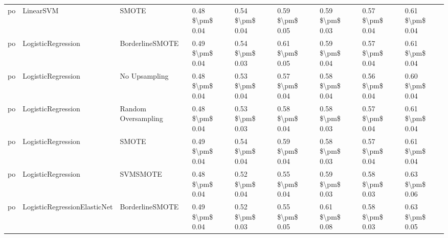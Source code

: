 \begin{tabular}{lllllllll}
      po &                       LinearSVM &                         SMOTE & 0.48 \$\textbackslash pm\$ 0.04 &           0.54 \$\textbackslash pm\$ 0.04 &       0.59 \$\textbackslash pm\$ 0.05 &        0.59 \$\textbackslash pm\$ 0.03 &                         0.57 \$\textbackslash pm\$ 0.04 &     0.61 \$\textbackslash pm\$ 0.04 \\
      po &              LogisticRegression &               BorderlineSMOTE & 0.49 \$\textbackslash pm\$ 0.04 &           0.54 \$\textbackslash pm\$ 0.03 &       0.61 \$\textbackslash pm\$ 0.05 &        0.59 \$\textbackslash pm\$ 0.04 &                         0.57 \$\textbackslash pm\$ 0.04 &     0.61 \$\textbackslash pm\$ 0.04 \\
      po &              LogisticRegression &                 No Upsampling & 0.48 \$\textbackslash pm\$ 0.04 &           0.53 \$\textbackslash pm\$ 0.04 &       0.57 \$\textbackslash pm\$ 0.04 &        0.58 \$\textbackslash pm\$ 0.04 &                         0.56 \$\textbackslash pm\$ 0.04 &     0.60 \$\textbackslash pm\$ 0.04 \\
      po &              LogisticRegression &           Random Oversampling & 0.48 \$\textbackslash pm\$ 0.04 &           0.53 \$\textbackslash pm\$ 0.03 &       0.58 \$\textbackslash pm\$ 0.04 &        0.58 \$\textbackslash pm\$ 0.03 &                         0.57 \$\textbackslash pm\$ 0.04 &     0.61 \$\textbackslash pm\$ 0.04 \\
      po &              LogisticRegression &                         SMOTE & 0.49 \$\textbackslash pm\$ 0.04 &           0.54 \$\textbackslash pm\$ 0.04 &       0.59 \$\textbackslash pm\$ 0.04 &        0.58 \$\textbackslash pm\$ 0.03 &                         0.57 \$\textbackslash pm\$ 0.04 &     0.61 \$\textbackslash pm\$ 0.04 \\
      po &              LogisticRegression &                      SVMSMOTE & 0.48 \$\textbackslash pm\$ 0.04 &           0.52 \$\textbackslash pm\$ 0.04 &       0.55 \$\textbackslash pm\$ 0.04 &        0.59 \$\textbackslash pm\$ 0.03 &                         0.58 \$\textbackslash pm\$ 0.03 &     0.63 \$\textbackslash pm\$ 0.06 \\
      po &    LogisticRegressionElasticNet &               BorderlineSMOTE & 0.49 \$\textbackslash pm\$ 0.04 &           0.52 \$\textbackslash pm\$ 0.03 &       0.55 \$\textbackslash pm\$ 0.05 &        0.61 \$\textbackslash pm\$ 0.08 &                         0.58 \$\textbackslash pm\$ 0.03 &     0.63 \$\textbackslash pm\$ 0.05 \\

\end{tabular}
